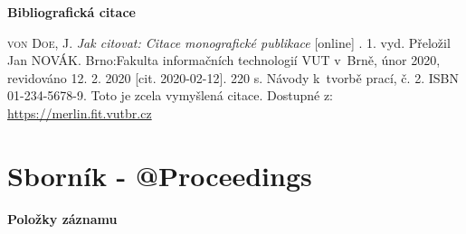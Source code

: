 \bigskip

\noindent \textbf{Bibliografická citace}

\medskip

\noindent \textsc{von Doe}, J. \textit{Jak citovat: Citace monografické publikace} [online] . 1. vyd. Přeložil Jan NOVÁK.
Brno:Fakulta informačních technologií VUT v~Brně, únor 2020, revidováno 12. 2. 2020 [cit. 2020-02-12]. 220 s. Návody k~tvorbě prací, č. 2. ISBN 01-234-5678-9. Toto je zcela vymyšlená citace. Dostupné z: \url{https://merlin.fit.vutbr.cz}
\newpage
\section*{Sborník - @Proceedings}
\label{pr-sbornik}
\noindent \textbf{Položky záznamu}

\medskip

